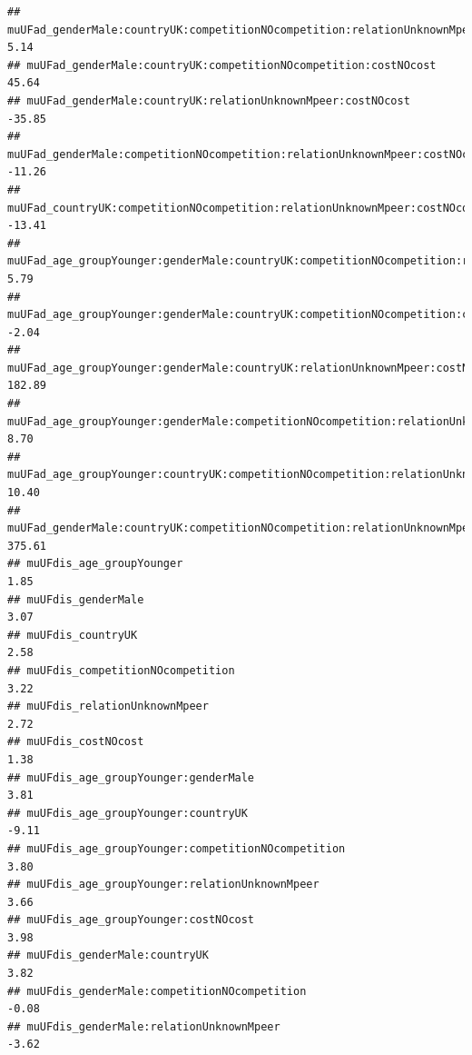 \documentclass[
]{article}
\begin{document}
\begin{verbatim}
## muUFad_genderMale:countryUK:competitionNOcompetition:relationUnknownMpeer                        5.14
## muUFad_genderMale:countryUK:competitionNOcompetition:costNOcost                                 45.64
## muUFad_genderMale:countryUK:relationUnknownMpeer:costNOcost                                    -35.85
## muUFad_genderMale:competitionNOcompetition:relationUnknownMpeer:costNOcost                     -11.26
## muUFad_countryUK:competitionNOcompetition:relationUnknownMpeer:costNOcost                      -13.41
## muUFad_age_groupYounger:genderMale:countryUK:competitionNOcompetition:relationUnknownMpeer       5.79
## muUFad_age_groupYounger:genderMale:countryUK:competitionNOcompetition:costNOcost                -2.04
## muUFad_age_groupYounger:genderMale:countryUK:relationUnknownMpeer:costNOcost                   182.89
## muUFad_age_groupYounger:genderMale:competitionNOcompetition:relationUnknownMpeer:costNOcost      8.70
## muUFad_age_groupYounger:countryUK:competitionNOcompetition:relationUnknownMpeer:costNOcost      10.40
## muUFad_genderMale:countryUK:competitionNOcompetition:relationUnknownMpeer:costNOcost           375.61
## muUFdis_age_groupYounger                                                                         1.85
## muUFdis_genderMale                                                                               3.07
## muUFdis_countryUK                                                                                2.58
## muUFdis_competitionNOcompetition                                                                 3.22
## muUFdis_relationUnknownMpeer                                                                     2.72
## muUFdis_costNOcost                                                                               1.38
## muUFdis_age_groupYounger:genderMale                                                              3.81
## muUFdis_age_groupYounger:countryUK                                                              -9.11
## muUFdis_age_groupYounger:competitionNOcompetition                                                3.80
## muUFdis_age_groupYounger:relationUnknownMpeer                                                    3.66
## muUFdis_age_groupYounger:costNOcost                                                              3.98
## muUFdis_genderMale:countryUK                                                                     3.82
## muUFdis_genderMale:competitionNOcompetition                                                     -0.08
## muUFdis_genderMale:relationUnknownMpeer                                                         -3.62

\end{verbatim}
\end{document}
